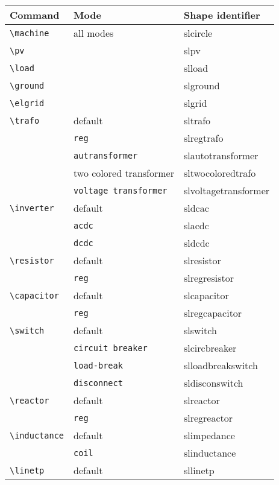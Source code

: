 \documentclass[a4]{article}
\begin{document}
\begin{table}[h]
\centering
 \setlength{\tabcolsep}{1cm}
\begin{tabular}{lll}
\toprule
\toprule
Command & Mode & Shape identifier\\
\midrule
\verb+\machine+        & all modes             & slcircle      \\
\verb+\pv+              &                       & slpv          \\
\verb+\load+            &                       & slload                \\
\verb+\ground+  &                       & slground      \\
\verb+\elgrid+  &                       & slgrid                \\
\verb+\trafo+   & default       & sltrafo       \\      
                                & \verb+reg+            & slregtrafo \\
                                & \verb+autransformer+          & slautotransformer \\
                            & two colored transformer  & sltwocoloredtrafo\\
                                & \verb+voltage transformer+    &slvoltagetransformer\\
\verb+\inverter+        & default       & sldcac                \\
                                & \verb+acdc+           & slacdc                \\
                                & \verb+dcdc+           & sldcdc                \\
\verb+\resistor+        & default       & slresistor \\
                                & \verb+reg+                    & slregresistor \\
\verb+\capacitor+       & default       & slcapacitor   \\
                                        & \verb+reg+                    & slregcapacitor \\
\verb+\switch+  & default       & slswitch      \\
                                & \verb+circuit breaker+        & slcircbreaker \\
                                & \verb+load-break+     & slloadbreakswitch     \\
                                & \verb+disconnect+     & sldisconswitch        \\
\verb+\reactor+         & default       & slreactor     \\
                                & \verb+reg+                    & slregreactor \\
\verb+\inductance+      & default       & slimpedance   \\
                                & \verb+coil+           & slinductance  \\
\verb+\linetp+  & default       & sllinetp      \\ 
\bottomrule
\bottomrule
\end{tabular}
\end{table}
\pagebreak
\end{document}
